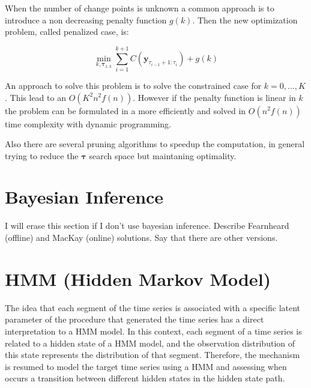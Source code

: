 

When the number of change points is unknown a common approach is to introduce a non decreasing penalty function $g(k)$. Then the new optimization problem, called penalized case, is:

\begin{equation}
    \min_{k, \boldsymbol \tau_{1 : k}} \sum \limits_{i = 1}^{k + 1} C(\mathbf{y}_{\tau_{i - 1} + 1 : \tau_{i}}) + g(k)
\end{equation}

An approach to solve this problem is to solve the constrained case for $k = 0, ..., K$. This lead to an $O(K^{2} n^{2} f(n))$. However if the penalty function is linear in $k$ the problem can be formulated in a more efficiently and solved in $O(n^{2} f(n))$ time complexity with dynamic programming.

Also there are several pruning algorithms to speedup the computation, in general trying to reduce the $\boldsymbol \tau$ search space but maintaning optimality.

\section{Bayesian Inference}
I will erase this section if I don't use bayesian inference. Describe Fearnheard (offline) and MacKay (online) solutions. Say that there are other versions.

\section{HMM (Hidden Markov Model)}

The idea that each segment of the time series is associated with a specific latent parameter of the procedure that generated the time series has a direct interpretation to a HMM model. In this context, each segment of a time series is related to a hidden state of a HMM model, and the observation distribution of this state represents the distribution of that segment. Therefore, the mechanism is resumed to model the target time series using a HMM and assessing when occurs a transition between different hidden states in the hidden state path.


